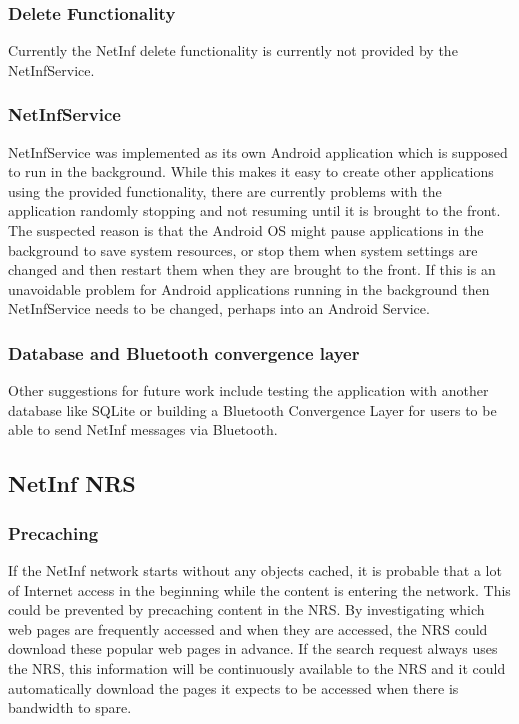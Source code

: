 \subsubsection{Delete Functionality}

Currently the NetInf delete functionality is currently not provided by the NetInfService.

\subsubsection{NetInfService}

NetInfService was implemented as its own Android application which is supposed to run in the background. 
While this makes it easy to create other applications using the provided functionality, there are currently 
problems with the application randomly stopping and not resuming until it is brought to the front. The suspected 
reason is that the Android OS might pause applications in the background to save system resources, or stop them 
when system settings are changed and then restart them when they are brought to the front. If this is an unavoidable 
problem for Android applications running in the background then NetInfService needs to be changed, perhaps into an Android Service.

\subsubsection{Database and Bluetooth convergence layer}

Other suggestions for future work include testing the application with another database like SQLite or building a
Bluetooth Convergence Layer for users to be able to send NetInf messages via Bluetooth. 

\subsection{NetInf NRS}

\subsubsection{Precaching}

If the NetInf network starts without any objects cached, it is probable that a lot of Internet access in the beginning 
while the content is entering the network. This could be prevented by precaching content in the NRS. By investigating 
which web pages are frequently accessed and when they are accessed, the NRS could download these popular web pages in 
advance. If the search request always uses the NRS, this information will be continuously available to the NRS and it 
could automatically download the pages it expects to be accessed when there is bandwidth to spare.

